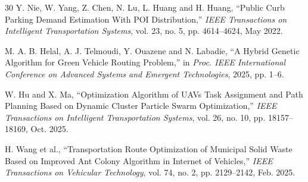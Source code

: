 \begin{thebibliography}{30}
Y. Nie, W. Yang, Z. Chen, N. Lu, L. Huang and H. Huang, ``Public Curb Parking Demand Estimation With POI Distribution,'' \emph{IEEE Transactions on Intelligent Transportation Systems}, vol. 23, no. 5, pp. 4614--4624, May 2022.

M. A. B. Helal, A. J. Telmoudi, Y. Ouazene and N. Labadie, ``A Hybrid Genetic Algorithm for Green Vehicle Routing Problem,'' in \emph{Proc. IEEE International Conference on Advanced Systems and Emergent Technologies}, 2025, pp. 1--6.

W. Hu and X. Ma, ``Optimization Algorithm of UAVs Task Assignment and Path Planning Based on Dynamic Cluster Particle Swarm Optimization,'' \emph{IEEE Transactions on Intelligent Transportation Systems}, vol. 26, no. 10, pp. 18157--18169, Oct. 2025.

H. Wang et al., ``Transportation Route Optimization of Municipal Solid Waste Based on Improved Ant Colony Algorithm in Internet of Vehicles,'' \emph{IEEE Transactions on Vehicular Technology}, vol. 74, no. 2, pp. 2129--2142, Feb. 2025.

\end{thebibliography}


\documentclass[conference]{IEEEtran}
